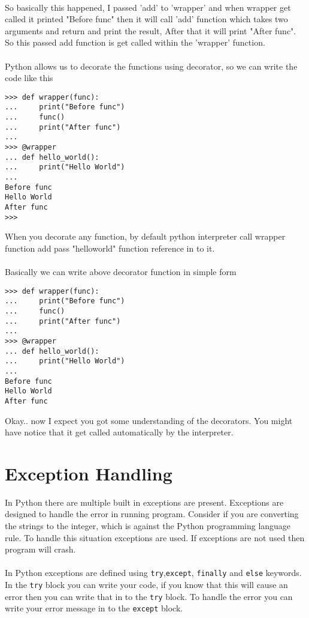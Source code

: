 \documentclass[letterpaper,12pt]{book}
\begin{document}
\paragraph{}
So basically this happened, I passed 'add' to 'wrapper' and when wrapper get called it printed "Before func" then it will call 'add' function which takes two arguments and return and print the result, After that it will print "After func". So this passed add function is get called within the 'wrapper' function.
\paragraph{}
Python allows us to decorate the functions using decorator, so we can write the code like this
\begin{lstlisting}
>>> def wrapper(func):
...     print("Before func")
...     func()
...     print("After func")
... 
>>> @wrapper
... def hello_world():
...     print("Hello World")
... 
Before func
Hello World
After func
>>> 
\end{lstlisting}

When you decorate any function, by default python interpreter call wrapper function add pass "hello\textunderscore world" function reference in to it.
\paragraph{}
Basically we can write above decorator function in simple form
\begin{lstlisting}
>>> def wrapper(func):
...     print("Before func")
...     func()
...     print("After func")
...
>>> @wrapper
... def hello_world():
...     print("Hello World")
...
Before func
Hello World
After func
\end{lstlisting}
Okay.. now I expect you got some understanding of the decorators. You might have notice that it get called automatically by the interpreter.

\section{Exception Handling}
In Python there are multiple built in exceptions are present. Exceptions are designed to handle the error in running program. Consider if you are converting the strings to the integer, which is against the Python programming language rule. To handle this situation exceptions are used. If exceptions are not used then program will crash.
\paragraph{}
In Python exceptions are defined using \texttt{try},\texttt{except}, \texttt{finally} and \texttt{else} keywords. In the \texttt{try} block you can write your code, if you know that this will cause an error then you can write that in to the \texttt{try} block. To handle the error you can write your error message in to the \texttt{except} block.
\end{document}
